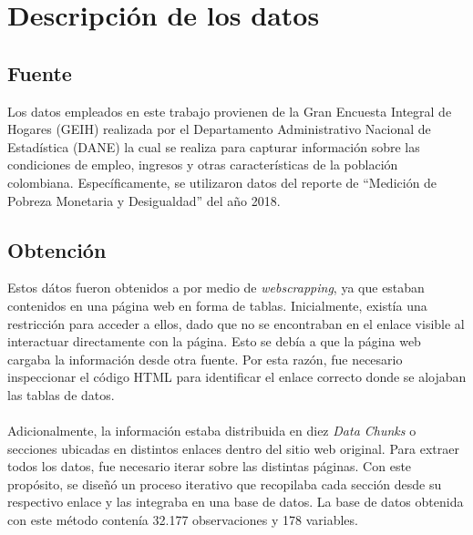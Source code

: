 \documentclass[article,11 pt]{article}
\begin{document}
\section{Descripción de los datos}
\subsection{Fuente}

Los datos empleados en este trabajo provienen de la Gran Encuesta Integral de Hogares (GEIH) realizada por el Departamento Administrativo Nacional de Estadística (DANE) la cual se realiza para capturar información sobre las condiciones de empleo, ingresos y otras características de la población colombiana. Específicamente, se utilizaron datos del reporte de “Medición de Pobreza Monetaria y Desigualdad” del año 2018. 

\subsection{Obtención}
Estos dátos fueron obtenidos a por medio de \textit{webscrapping}, ya que estaban contenidos en una página web en forma de tablas. Inicialmente, existía una restricción para acceder a ellos, dado que no se encontraban en el enlace visible al interactuar directamente con la página. Esto se debía a que la página web cargaba la información desde otra fuente. Por esta razón, fue necesario inspeccionar el código HTML para identificar el enlace correcto donde se alojaban las tablas de datos.
\\
\\
Adicionalmente, la información estaba distribuida en diez \textit{Data Chunks} o secciones ubicadas en distintos enlaces dentro del sitio web original. Para extraer todos los datos, fue necesario iterar sobre las distintas páginas. Con este propósito, se diseñó un proceso iterativo que recopilaba cada sección desde su respectivo enlace y las integraba en una base de datos. La base de datos obtenida con este método contenía 32.177 observaciones y 178 variables.
\end{document}
